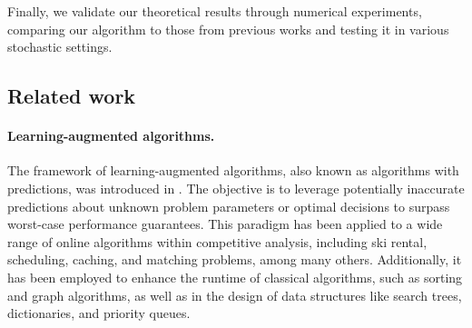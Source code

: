 

Finally, we validate our theoretical results through numerical experiments, comparing our algorithm to those from previous works and testing it in various stochastic settings.



\subsection{Related work}
\paragraph{Learning-augmented algorithms.}
The framework of learning-augmented algorithms, also known as algorithms with predictions, was introduced in \cite{}. The objective is to leverage potentially inaccurate predictions about unknown problem parameters or optimal decisions to surpass worst-case performance guarantees. This paradigm has been applied to a wide range of online algorithms within competitive analysis, including ski rental, scheduling, caching, and matching problems, among many others. Additionally, it has been employed to enhance the runtime of classical algorithms, such as sorting and graph algorithms, as well as in the design of data structures like search trees, dictionaries, and priority queues.


